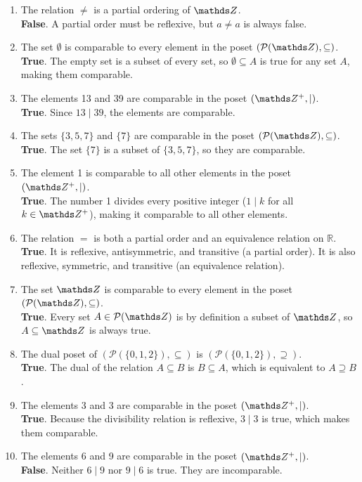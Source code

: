 \documentclass[10pt]{article}
\theoremstyle{definition}
\theoremstyle{plain}
\numberwithin{equation}{section}
\begin{document}
\begin{enumerate}
  \item The relation $\neq$ is a partial ordering of $\setZ$. \\
  \textbf{False}. A partial order must be reflexive, but $a \neq a$ is always false.

  \item The set $\emptyset$ is comparable to every element in the poset $(\mathcal{P}(\setZ), \subseteq)$. \\
  \textbf{True}. The empty set is a subset of every set, so $\emptyset \subseteq A$ is true for any set $A$, making them comparable.

  \item The elements 13 and 39 are comparable in the poset $(\setZ^{+}, \mid)$. \\
  \textbf{True}. Since $13 \mid 39$, the elements are comparable.

  \item The sets $\{3,5,7\}$ and $\{7\}$ are comparable in the poset $(\mathcal{P}(\setZ), \subseteq)$. \\
  \textbf{True}. The set $\{7\}$ is a subset of $\{3, 5, 7\}$, so they are comparable.

  \item The element 1 is comparable to all other elements in the poset $(\setZ^{+}, \mid)$. \\
  \textbf{True}. The number 1 divides every positive integer ($1 \mid k$ for all $k \in \setZ^{+}$), making it comparable to all other elements.

  \item The relation $=$ is both a partial order and an equivalence relation on $\mathbb{R}$. \\
  \textbf{True}. It is reflexive, antisymmetric, and transitive (a partial order). It is also reflexive, symmetric, and transitive (an equivalence relation).

  \item The set $\setZ$ is comparable to every element in the poset $(\mathcal{P}(\setZ), \subseteq)$. \\
  \textbf{True}. Every set $A \in \mathcal{P}(\setZ)$ is by definition a subset of $\setZ$, so $A \subseteq \setZ$ is always true.

  \item The dual poset of $(\mathcal{P}(\{0,1,2\}), \subseteq)$ is $(\mathcal{P}(\{0,1,2\}), \supseteq)$. \\
  \textbf{True}. The dual of the relation $A \subseteq B$ is $B \subseteq A$, which is equivalent to $A \supseteq B$.

  \item The elements 3 and 3 are comparable in the poset $(\setZ^{+}, \mid)$. \\
  \textbf{True}. Because the divisibility relation is reflexive, $3 \mid 3$ is true, which makes them comparable.

  \item The elements 6 and 9 are comparable in the poset $(\setZ^{+}, \mid)$. \\
  \textbf{False}. Neither $6 \mid 9$ nor $9 \mid 6$ is true. They are incomparable.

\end{enumerate}
\end{document}
